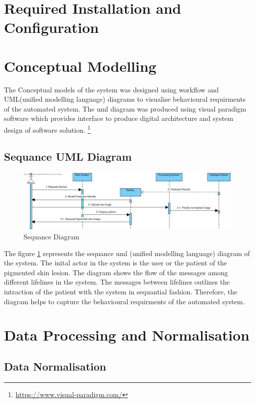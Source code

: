 \section{Required Installation and Configuration}

\pagebreak
\section{Conceptual Modelling}
The Conceptual models of the system was designed using workflow 
and UML(unified modelling language) diagrams to visualise
behavioural requirments of the automated system. 
The uml diagram was produced using visual paradigm software which provides 
interface to produce digital architecture and system design of software solution. \footnote{\url{https://www.visual-paradigm.com/}}

\subsection{Sequance UML Diagram}
\begin{figure}[!htp]
    \centering
    \includegraphics[width=\textwidth]{Images/code.png}
    \caption{Sequance Diagram}
    \label{figure:Sequance}
\end{figure}
The figure \ref{figure:Sequance} represents the sequance uml (unified modelling language) diagram of the 
system. The inital actor in the system is the user or the patient of the 
pigmented skin lesion. The diagram shows the flow of the messages among 
different lifelines in the system. The messages between lifelines outlines the intraction of
the patient with the system in sequantial fashion. Therefore, the diagram helps to capture the 
behavioural requirments of the automated system.
\section{Data Processing and Normalisation}

\subsection{Data Normalisation}

\pagebreak
